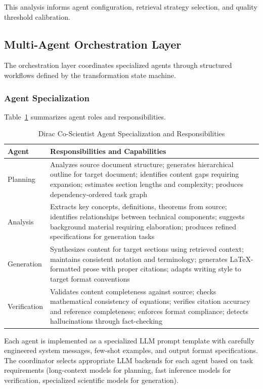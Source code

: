 \documentclass{ieeeaccess}
\begin{document}
This analysis informs agent configuration, retrieval strategy selection, and quality threshold calibration.

\subsection{Multi-Agent Orchestration Layer}

The orchestration layer coordinates specialized agents through structured workflows defined by the transformation state machine.

\subsubsection{Agent Specialization}

Table~\ref{tab:agents} summarizes agent roles and responsibilities.

\begin{table}[!t]
\caption{Dirac Co-Scientist Agent Specialization and Responsibilities}
\label{tab:agents}
\centering
\renewcommand{\arraystretch}{1.3}
\begin{tabular}{p{1.9cm}p{6.2cm}}
\toprule
\textbf{Agent} & \textbf{Responsibilities and Capabilities} \\
\midrule
Planning & Analyzes source document structure; generates hierarchical outline for target document; identifies content gaps requiring expansion; estimates section lengths and complexity; produces dependency-ordered task graph \\
\midrule
Analysis & Extracts key concepts, definitions, theorems from source; identifies relationships between technical components; suggests background material requiring elaboration; produces refined specifications for generation tasks \\
\midrule
Generation & Synthesizes content for target sections using retrieved context; maintains consistent notation and terminology; generates LaTeX-formatted prose with proper citations; adapts writing style to target format conventions \\
\midrule
Verification & Validates content completeness against source; checks mathematical consistency of equations; verifies citation accuracy and reference completeness; enforces format compliance; detects hallucinations through fact-checking \\
\bottomrule
\end{tabular}
\end{table}

Each agent is implemented as a specialized LLM prompt template with carefully engineered system messages, few-shot examples, and output format specifications. The coordinator selects appropriate LLM backends for each agent based on task requirements (long-context models for planning, fast inference models for verification, specialized scientific models for generation).
\end{document}
